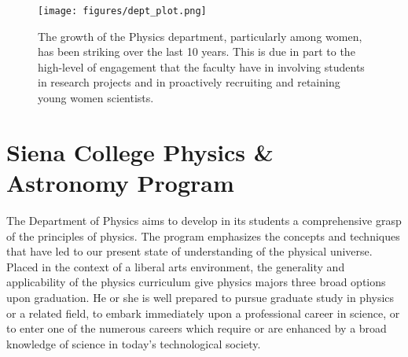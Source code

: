 \documentclass[11pt]{article}
\begin{document}

\begin{SCfigure}
    \centering
    \texttt{[image: figures/dept\_plot.png]}
    \caption{The growth of the Physics department, particularly
        among women, has been striking over the last 10 years. 
        This is due in part to the high-level of engagement that the faculty
        have in involving students in research projects and in proactively
        recruiting and retaining young women scientists.
     \label{fig:dept}}
\end{SCfigure}

\section{Siena College Physics \& Astronomy Program}
The Department of Physics aims to develop in its students a comprehensive grasp of the principles of physics. The program
emphasizes the concepts and techniques that have led to our present state of understanding of
the physical universe. Placed in the context of a liberal arts environment, the generality and
applicability of the physics curriculum give physics majors three broad options upon graduation.
He or she is well prepared to pursue graduate study in physics or a related field, to embark
immediately upon a professional career in science, or to enter one of the numerous careers which
require or are enhanced by a broad knowledge of science in today's technological society.
\end{document}
